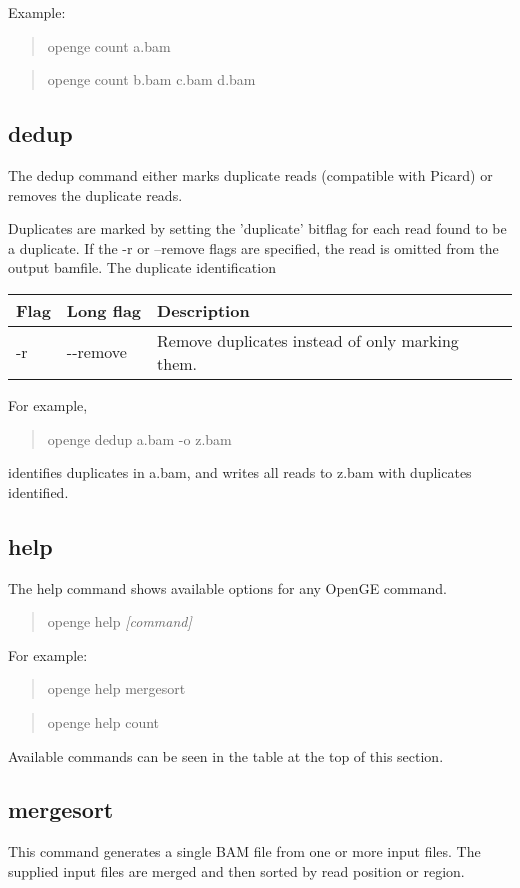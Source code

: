 \documentclass[11pt]{article}
\newcommand {\cmd}[1] {\begin{quote}#1\end{quote}}
\begin{document}
Example:
\cmd{openge count a.bam}
\cmd{openge count b.bam c.bam d.bam}

\subsection {dedup}
The dedup command either marks duplicate reads (compatible with Picard) or removes the duplicate reads. 

Duplicates are marked by setting the 'duplicate' bitflag for each read found to be a duplicate. If the -r or --remove flags are specified, the read is omitted from the output bamfile. The duplicate identification 

\begin{center}
\begin{tabular}{llp{3.5in}}
\hline
Flag&Long flag&Description\\ \hline
-r&{-}{-}remove&Remove duplicates instead of only marking them.\\
\end{tabular}
\end{center}

For example,
\cmd{openge dedup a.bam -o z.bam} 
identifies duplicates in a.bam, and writes all reads to z.bam with duplicates identified.

\subsection {help}
The help command shows available options for any OpenGE command. 

\cmd{openge help \textit{[command]}}

For example:

\cmd{openge help mergesort}

\cmd{openge help count}

Available commands can be seen in the table at the top of this section.


\subsection {mergesort}
This command generates a single BAM file from one or more input files. The supplied input files are merged and then sorted by read position or region.
\end{document}
